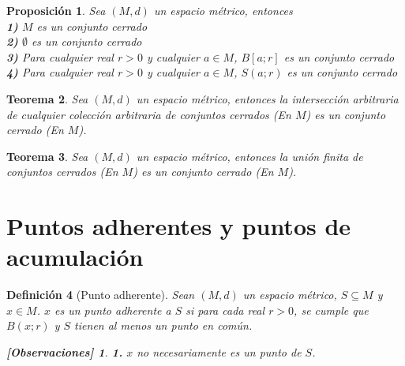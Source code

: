 \documentclass[oneside]{book} %
\theoremstyle{Teorema}
\newtheorem{Definicion}{Definición}[chapter]
\newtheorem{Teorema}[Definicion]{Teorema}
\newtheorem{Proposicion}[Definicion]{Proposición}
\theoremstyle{Ejemplos}
\theoremstyle{[Obs]}
\newtheorem*{Obs}{[Observaciones]}
\renewcommand{\{}{\left\lbrace} %
\renewcommand{\}}{\right\rbrace} %
\renewcommand{\sc}{\subseteq} %
\begin{document}
			\begin{Proposicion}
				
				Sea $(M, d)$ un espacio métrico, entonces \\

				\textbf{1)} $M$ es un conjunto cerrado \\

				\textbf{2)} $\emptyset$ es un conjunto cerrado \\

				\textbf{3)} Para cualquier real $r > 0$ y cualquier $a \in M$, $B[a;r]$ es un conjunto cerrado \\

				\textbf{4)} Para cualquier real $r > 0$ y cualquier $a \in M$, $S(a;r)$ es un conjunto cerrado \\

			\end{Proposicion}

			\begin{Teorema}

				Sea $(M, d)$ un espacio métrico, entonces la intersección arbitraria de cualquier colección arbitraria de conjuntos cerrados (En $M$) es un conjunto cerrado (En $M$). \\

			\end{Teorema}

			\begin{Teorema}

				Sea $(M, d)$ un espacio métrico, entonces la unión finita de conjuntos cerrados (En $M$) es un conjunto cerrado (En $M$). \\

			\end{Teorema}

		\section{Puntos adherentes y puntos de acumulación}

			\begin{Definicion}[Punto adherente]
				
				Sean $(M, d)$ un espacio métrico, $S \sc M$ y $x \in M$. $x$ es un punto adherente a $S$ si para cada real $r > 0$, se cumple que $B(x;r)$ y $S$ tienen al menos un punto en común. \\

				\begin{Obs}
				
					\hfill
				
					\textbf{1.} $x$ no necesariamente es un punto de $S$. \\
				
				\end{Obs}

			\end{Definicion}
\end{document}
